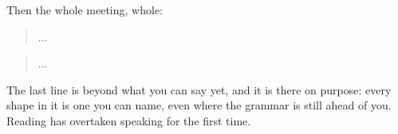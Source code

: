 \begin{quote}
\end{quote}

\begin{quote}
\end{quote}

\begin{quote}
\end{quote}

\begin{quote}
\end{quote}

\begin{quote}
\end{quote}

\begin{quote}
\end{quote}

\begin{quote}
\end{quote}

\begin{quote}
\end{quote}

Then the whole meeting, whole:

\begin{quote}
\end{quote}

\begin{quote}
    
\end{quote}

\begin{quote}
  ... 
\end{quote}

\begin{quote}
  
\end{quote}

\begin{quote}
 ... 
\end{quote}

\begin{quote}
     
\end{quote}

The last line is beyond what you can say yet, and it is there on purpose: every shape in it is one you can name, even where the grammar is still ahead of you. Reading has overtaken speaking for the first time.

